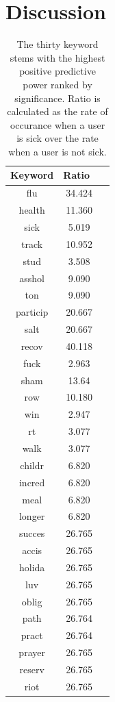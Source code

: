 \documentclass{acm_proc_article-sp}
\begin{document}
\section{Discussion}

 \begin{table}
\centering
\begin{tabular}{|c|c|c|} \hline
Keyword&Ratio\ \\ \hline
flu &  34.424\\ \hline
health &  11.360\\ \hline
sick &  5.019\\ \hline
track & 10.952 \\ \hline
stud & 3.508 \\ \hline
asshol & 9.090 \\ \hline
ton & 9.090 \\ \hline
particip & 20.667 \\ \hline
salt & 20.667 \\ \hline
recov & 40.118 \\ \hline
fuck & 2.963 \\ \hline
sham & 13.64 \\ \hline
row & 10.180 \\ \hline
win & 2.947 \\ \hline
rt & 3.077 \\ \hline
walk & 3.077 \\ \hline
childr & 6.820 \\ \hline
incred & 6.820 \\ \hline
meal & 6.820 \\ \hline
longer &  6.820 \\ \hline
succes &  26.765 \\ \hline
accis & 26.765 \\ \hline
holida & 26.765 \\ \hline
luv & 26.765 \\ \hline
oblig & 26.765 \\ \hline
path & 26.764 \\ \hline
pract & 26.764 \\ \hline
prayer & 26.765 \\ \hline
reserv & 26.765 \\ \hline
riot & 26.765 \\ 
\hline\end{tabular}
\caption{The thirty keyword stems with the highest positive predictive power ranked by significance. Ratio is calculated as the rate of occurance when a user is sick over the rate when a user is not sick.}
\label{tab:thirty_best}
\end{table}
\end{document}
